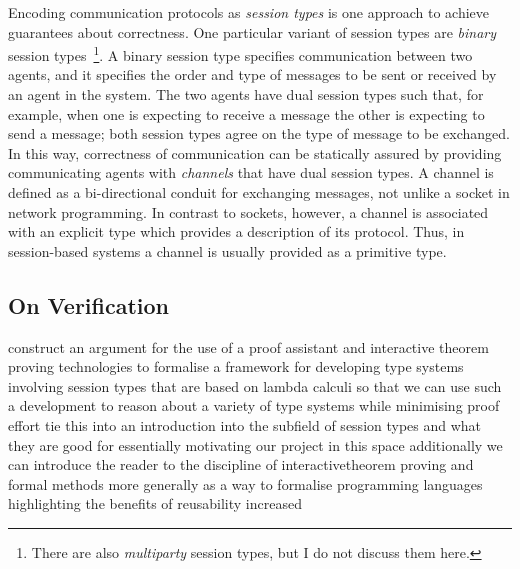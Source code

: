 \documentclass{mprop}
\begin{document}
Encoding communication protocols as \textit{session types} is one approach to achieve guarantees about correctness. One particular variant of session types are \textit{binary} session types~\footnote{There are also \textit{multiparty} session types, but I do not discuss them here.}. A binary session type specifies communication between two agents, and it specifies the order and type of messages to be sent or received by an agent in the system. The two agents have dual session types such that, for example, when one is expecting to receive a message the other is expecting to send a message; both session types agree on the type of message to be exchanged. In this way, correctness of communication can be statically assured by providing communicating agents with \textit{channels} that have dual session types. A channel is defined as a bi-directional conduit for exchanging messages, not unlike a socket in network programming. In contrast to sockets, however, a channel is associated with an explicit type which provides a description of its protocol. Thus, in session-based systems a channel is usually provided as a primitive type.

\subsection{On Verification}

construct an argument for the use of a proof assistant and interactive theorem proving technologies to formalise a framework for developing type systems involving session types that are based on lambda calculi so that we can use such a development to reason about a variety of type systems while minimising proof effort tie this into an introduction into the subfield of session types and what they are good for essentially motivating our project in this space additionally we can introduce the reader to the discipline of interactivetheorem proving and formal methods more generally as a way to formalise programming languages highlighting the benefits of reusability increased
\end{document}
